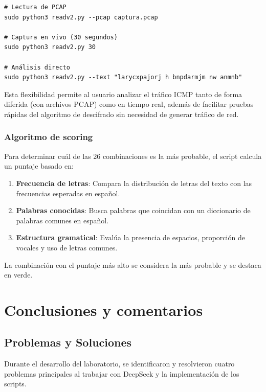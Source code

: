 \documentclass[letter,12pt]{article}
\begin{document}
\begin{verbatim}
# Lectura de PCAP
sudo python3 readv2.py --pcap captura.pcap

# Captura en vivo (30 segundos)
sudo python3 readv2.py 30

# Análisis directo
sudo python3 readv2.py --text "larycxpajorj h bnpdarmjm nw anmnb"
\end{verbatim}

Esta flexibilidad permite al usuario analizar el tráfico ICMP tanto de forma diferida (con archivos PCAP) como en tiempo real, además de facilitar pruebas rápidas del algoritmo de descifrado sin necesidad de generar tráfico de red.

\subsubsection*{Algoritmo de scoring}

Para determinar cuál de las 26 combinaciones es la más probable, el script calcula un puntaje basado en:

\begin{enumerate}
    \item \textbf{Frecuencia de letras}: Compara la distribución de letras del texto con las frecuencias esperadas en español.
    \item \textbf{Palabras conocidas}: Busca palabras que coincidan con un diccionario de palabras comunes en español.
    \item \textbf{Estructura gramatical}: Evalúa la presencia de espacios, proporción de vocales y uso de letras comunes.
\end{enumerate}

La combinación con el puntaje más alto se considera la más probable y se destaca en verde.





\section*{Conclusiones y comentarios}

\subsection{Problemas y Soluciones}

Durante el desarrollo del laboratorio, se identificaron y resolvieron cuatro problemas principales al trabajar con DeepSeek y la implementación de los scripts.
\end{document}
